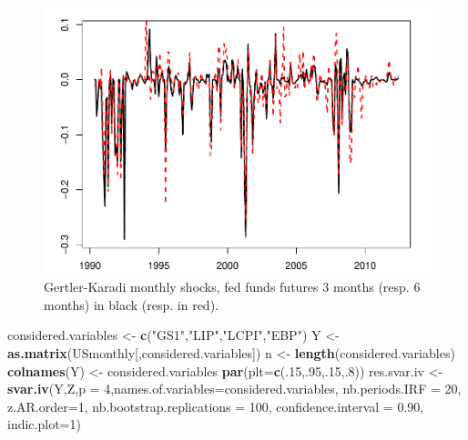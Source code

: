 \documentclass[
  12pt,
]{book}
\newenvironment{Shaded}{\begin{snugshade}}{\end{snugshade}}
\newcommand{\AttributeTok}[1]{\textcolor[rgb]{0.13,0.29,0.53}{#1}}
\newcommand{\DecValTok}[1]{\textcolor[rgb]{0.00,0.00,0.81}{#1}}
\newcommand{\FloatTok}[1]{\textcolor[rgb]{0.00,0.00,0.81}{#1}}
\newcommand{\FunctionTok}[1]{\textcolor[rgb]{0.13,0.29,0.53}{\textbf{#1}}}
\newcommand{\NormalTok}[1]{#1}
\newcommand{\OtherTok}[1]{\textcolor[rgb]{0.56,0.35,0.01}{#1}}
\newcommand{\StringTok}[1]{\textcolor[rgb]{0.31,0.60,0.02}{#1}}
\theoremstyle{definition}
\theoremstyle{definition}
\theoremstyle{definition}
\theoremstyle{definition}
\theoremstyle{remark}
\begin{document}
\begin{figure}
\includegraphics[width=0.95\linewidth]{IdentifStructShocks_files/figure-latex/essaiIV0-1} \caption{Gertler-Karadi monthly shocks, fed funds futures 3 months (resp. 6 months) in black (resp. in red).}\label{fig:essaiIV0}
\end{figure}

\begin{Shaded}
\begin{Highlighting}[]
\NormalTok{considered.variables }\OtherTok{\textless{}{-}} \FunctionTok{c}\NormalTok{(}\StringTok{"GS1"}\NormalTok{,}\StringTok{"LIP"}\NormalTok{,}\StringTok{"LCPI"}\NormalTok{,}\StringTok{"EBP"}\NormalTok{)}
\NormalTok{Y }\OtherTok{\textless{}{-}} \FunctionTok{as.matrix}\NormalTok{(USmonthly[,considered.variables])}
\NormalTok{n }\OtherTok{\textless{}{-}} \FunctionTok{length}\NormalTok{(considered.variables)}
\FunctionTok{colnames}\NormalTok{(Y) }\OtherTok{\textless{}{-}}\NormalTok{ considered.variables}
\FunctionTok{par}\NormalTok{(}\AttributeTok{plt=}\FunctionTok{c}\NormalTok{(.}\DecValTok{15}\NormalTok{,.}\DecValTok{95}\NormalTok{,.}\DecValTok{15}\NormalTok{,.}\DecValTok{8}\NormalTok{))}
\NormalTok{res.svar.iv }\OtherTok{\textless{}{-}} 
  \FunctionTok{svar.iv}\NormalTok{(Y,Z,}\AttributeTok{p =} \DecValTok{4}\NormalTok{,}\AttributeTok{names.of.variables=}\NormalTok{considered.variables,}
          \AttributeTok{nb.periods.IRF =} \DecValTok{20}\NormalTok{,}
          \AttributeTok{z.AR.order=}\DecValTok{1}\NormalTok{, }
          \AttributeTok{nb.bootstrap.replications =} \DecValTok{100}\NormalTok{, }
          \AttributeTok{confidence.interval =} \FloatTok{0.90}\NormalTok{,}
          \AttributeTok{indic.plot=}\DecValTok{1}\NormalTok{)}
\end{Highlighting}
\end{Shaded}
\end{document}
